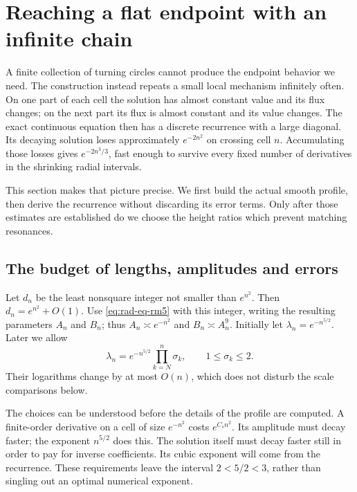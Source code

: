 \section{Reaching a flat endpoint with an infinite chain}
\label{sec:radial-tails}
\label{sec:radial-selection}

A finite collection of turning circles cannot produce the endpoint
behavior we need.  The construction instead repeats a small local
mechanism infinitely often.  On one part of each cell the solution has
almost constant value and its flux changes; on the next part its flux
is almost constant and its value changes.  The exact continuous equation
then has a discrete recurrence with a large diagonal.  Its decaying
solution loses approximately $e^{-2n^2}$ on crossing cell $n$.
Accumulating those losses gives $e^{-2n^3/3}$, fast enough to survive
every fixed number of derivatives in the shrinking radial intervals.

This section makes that picture precise.  We first build the actual
smooth profile, then derive the recurrence without discarding its error
terms.  Only after those estimates are established do we choose the
height ratios which prevent matching resonances.

\subsection{The budget of lengths, amplitudes and errors}

Let $d_n$ be the least nonsquare integer not smaller than $e^{n^2}$.
Then $d_n=e^{n^2}+O(1)$.  Use \eqref{eq:rad-eq-rm5} with this integer,
writing the resulting parameters $A_n$ and $B_n$; thus
$A_n\asymp e^{-n^2}$ and $B_n\asymp A_n^9$.
Initially let $\lambda_n=e^{-n^{5/2}}$.  Later we allow
\begin{equation}\label{eq:rad-eq-js2}
 \lambda_n=e^{-n^{5/2}}\prod_{k=N}^n\sigma_k,
 \qquad 1\le\sigma_k\le2.
\end{equation}
Their logarithms change by at most $O(n)$, which does not disturb the
scale comparisons below.

The choices can be understood before the details of the profile are
computed.  A finite-order derivative on a cell of size $e^{-n^2}$
costs $e^{C_sn^2}$.  Its amplitude must decay faster; the exponent
$n^{5/2}$ does this.  The solution itself must decay faster still in
order to pay for inverse coefficients.  Its cubic exponent will come
from the recurrence.  These requirements leave the interval
$2<5/2<3$, rather than singling out an optimal numerical exponent.

